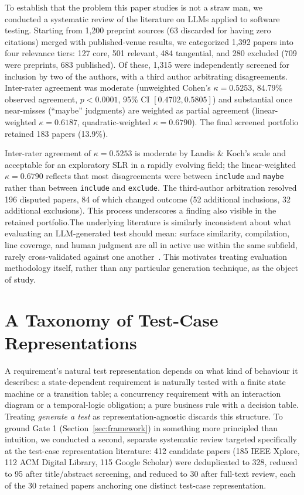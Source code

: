 \documentclass[conference]{IEEEtran}
\begin{document}
  To establish that the problem this paper studies is not a straw man, we
  conducted a systematic review of the literature on LLMs applied to software
  testing. Starting from 1{,}200 preprint sources (63 discarded for having zero
  citations) merged with published-venue results, we categorized 1{,}392 papers
  into four relevance tiers: 127 core, 501 relevant, 484 tangential, and 280
  excluded (709 were preprints, 683 published). Of these, 1{,}315 were
  independently screened for inclusion by two of the authors, with a third
  author arbitrating disagreements. Inter-rater agreement was moderate
  (unweighted Cohen's $\kappa=0.5253$, 84.79\% observed agreement, $p<0.0001$,
  95\% CI $[0.4702, 0.5805]$) and substantial once near-misses (``maybe''
  judgments) are weighted as partial agreement (linear-weighted
  $\kappa=0.6187$, quadratic-weighted $\kappa=0.6790$). The final screened
  portfolio retained 183 papers (13.9\%).

  Inter-rater agreement of $\kappa=0.5253$ is moderate by Landis \& Koch's
  scale and acceptable for an exploratory SLR in a rapidly evolving field; the
  linear-weighted $\kappa=0.6790$ reflects that most disagreements were between
  \texttt{include} and \texttt{maybe} rather than between \texttt{include} and \texttt{exclude}.
  The third-author arbitration resolved 196 disputed papers, 84 of which
  changed outcome (52 additional inclusions, 32 additional exclusions). This
  process underscores a finding also visible in the retained portfolio.The underlying literature is similarly inconsistent about what evaluating
  an LLM-generated test should mean: surface similarity, compilation, line
  coverage, and human judgment are all in active use within the same subfield,
  rarely cross-validated against one another~\cite{yuan2023chatgpt,schafer2023empirical}.
  This motivates treating evaluation methodology itself, rather than any
  particular generation technique, as the object of study.

  \section{A Taxonomy of Test-Case Representations}
  \label{sec:taxonomy}

  A requirement's natural test representation depends on what kind of behaviour
  it describes: a state-dependent requirement is naturally tested with a finite
  state machine or a transition table; a concurrency requirement with an
  interaction diagram or a temporal-logic obligation; a pure business rule with
  a decision table. Treating \textit{generate a test} as representation-agnostic
  discards this structure. To ground Gate 1 (Section~\ref{sec:framework}) in
  something more principled than intuition, we conducted a second, separate
  systematic review targeted specifically at the test-case representation
  literature: 412 candidate papers (185 IEEE Xplore, 112 ACM Digital Library,
  115 Google Scholar) were deduplicated to 328, reduced to 95 after
  title/abstract screening, and reduced to 30 after full-text review, each of
  the 30 retained papers anchoring one distinct test-case representation.
\end{document}
